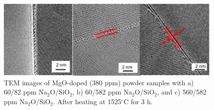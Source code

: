 \newpage
\begin{figure}[H]
	\centering
	\includegraphics[width=\textwidth]{Chapter-4/Figures/Figure12.png}
	\caption{TEM images of MgO-doped (380 ppm) powder samples with a) 60/82 ppm Na$_{2}$O/SiO$_{2}$, b) 60/582 ppm Na$_{2}$O/SiO$_{2}$, and c) 560/582 ppm Na$_{2}$O/SiO$_{2}$. After heating at 1525$^{\circ}$C for 3 h.}
	\label{Ch4-figure:Figure12}
\end{figure}
